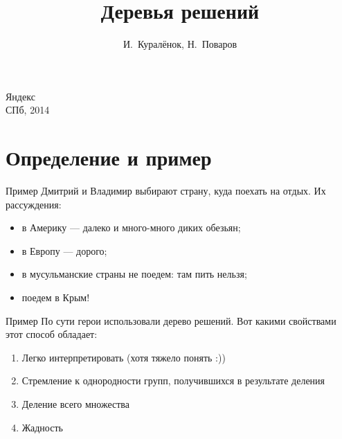 \documentclass[14pt, fleqn, xcolor={dvipsnames, table}]{beamer}
\title{Деревья решений\\\small{}}
\author[]{\small{%
И.~Куралёнок,
Н.~Поваров}}
\date{}
\begin{document}
\begin{frame}
\maketitle
\small
\begin{center}
\vspace{-60pt}
\normalsize {\color{red}Я}ндекс \\
\vspace{80pt}
\footnotesize СПб, 2014
\end{center}
\end{frame}

\section{Определение и пример}
\begin{frame}{Пример}
Дмитрий и Владимир выбирают страну, куда поехать на отдых. Их рассуждения:
\begin{itemize}
  \item в Америку --- далеко и много-много диких обезьян;
  \item в Европу --- дорого;
  \item в мусульманские страны не поедем: там пить нельзя;
  \item поедем в Крым!
\end{itemize}
\end{frame}

\begin{frame}{Пример}
По сути герои использовали дерево решений. Вот какими свойствами этот способ обладает:
\begin{enumerate}
  \item Легко интерпретировать (хотя тяжело понять :))
  \item Стремление к однородности групп, получившихся в результате деления
  \item Деление всего множества
  \item Жадность
\end{enumerate}
\end{frame}
\end{document}
